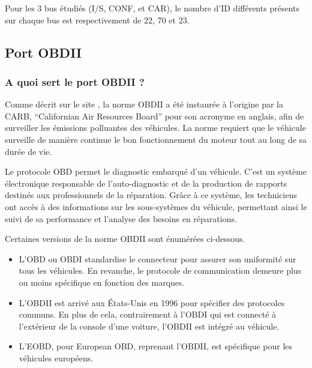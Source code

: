 \documentclass{rapportECC}
\begin{document}
Pour les 3 bus étudiés (I/S, CONF, et CAR), le nombre d'ID différents présents sur chaque bus est respectivement de 22, 70 et 23.


\subsection{Port OBDII}

\subsubsection*{A quoi sert le port OBDII ?}

Comme décrit sur le site \cite{klavkarr}, la norme OBDII a été instaurée à l'origine par la CARB, ``Californian Air Resources Board'' pour son acronyme en anglais, afin de surveiller les émissions polluantes des véhicules. La norme requiert que le véhicule surveille de manière continue le bon fonctionnement du moteur tout au long de sa durée de vie.\pagebreak

Le protocole OBD permet le diagnostic embarqué d'un véhicule. C'est un système électronique responsable de l'auto-diagnostic et de la production de rapports destinés aux professionnels de la réparation. Grâce à ce système, les techniciens ont accès à des informations sur les sous-systèmes du véhicule, permettant ainsi le suivi de sa performance et l'analyse des besoins en réparations.

Certaines versions de la norme OBDII sont énumérées ci-dessous.
\begin{itemize}
    \item L'OBD ou OBDI standardise le connecteur pour assurer son uniformité sur tous les véhicules. En revanche, le protocole de communication demeure plus ou moins spécifique en fonction des marques.
    \item L'OBDII est arrivé aux États-Unis en 1996 pour spécifier des protocoles communs. En plus de cela, contrairement à l'OBDI qui est connecté à l'extérieur de la console d'une voiture, l'OBDII est intégré au véhicule.
    \item L'EOBD, pour European OBD, reprenant l'OBDII, est spécifique pour les véhicules européens.
\end{itemize}
    
\end{document}
